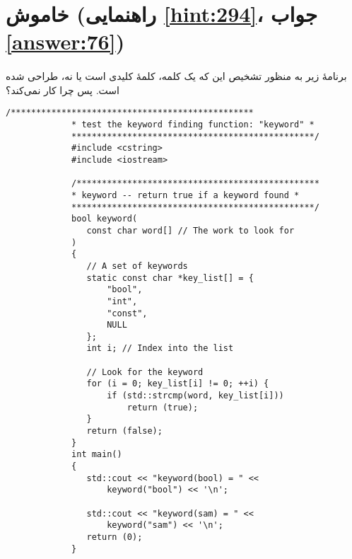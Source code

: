 \section[خاموش]{خاموش \protect{} (راهنمایی \ref{hint:294}، جواب \ref{answer:76})}
\paragraph{}\label{prog:15}
برنامهٔ زیر به منظور تشخیص این که یک کلمه، کلمهٔ کلیدی است یا نه، طراحی شده است. پس چرا کار نمی‌کند؟

\begin{LTR}
        \begin{lstlisting}[style=C++Style]
             /************************************************
             * test the keyword finding function: "keyword" *
             ************************************************/
             #include <cstring>
             #include <iostream>

             /************************************************
             * keyword -- return true if a keyword found *
             ************************************************/
             bool keyword(
             	const char word[] // The work to look for
             )
             {
             	// A set of keywords
             	static const char *key_list[] = {
             		"bool",
             		"int",
             		"const",
             		NULL
             	};
             	int i; // Index into the list

             	// Look for the keyword
             	for (i = 0; key_list[i] != 0; ++i) {
             		if (std::strcmp(word, key_list[i]))
             			return (true);
             	}
             	return (false);
             }
             int main()
             {
             	std::cout << "keyword(bool) = " <<
             		keyword("bool") << '\n';

             	std::cout << "keyword(sam) = " <<
             		keyword("sam") << '\n';
             	return (0);
             }
        \end{lstlisting}
\end{LTR}